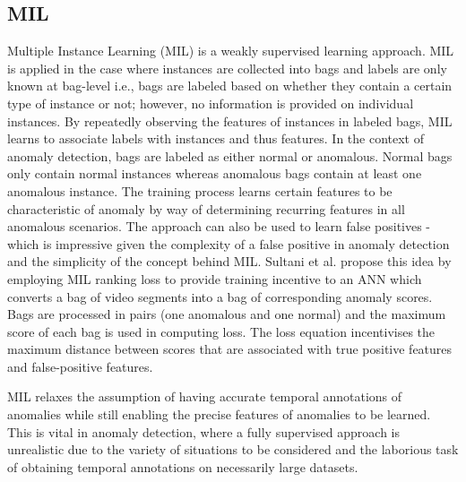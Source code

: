 \documentclass[sigplan,authorversion,nonacm, 9pt]{acmart}
\begin{document}
\subsection{MIL} \label{subsec:MIL}
Multiple Instance Learning (MIL) is a weakly supervised learning approach. MIL is applied in the case where instances are collected into bags and labels are only known at bag-level i.e., bags are labeled based on whether they contain a certain type of instance or not; however, no information is provided on individual instances. By repeatedly observing the features of instances in labeled bags, MIL learns to associate labels with instances and thus features. In the context of anomaly detection, bags are labeled as either normal or anomalous. Normal bags only contain normal instances whereas anomalous bags contain at least one anomalous instance. The training process learns certain features to be characteristic of anomaly by way of determining recurring features in all anomalous scenarios. The approach can also be used to learn false positives - which is impressive given the complexity of a false positive in anomaly detection and the simplicity of the concept behind MIL. Sultani et al. \cite{sultani} propose this idea by employing MIL ranking loss to provide training incentive to an ANN which converts a bag of video segments into a bag of corresponding anomaly scores. Bags are processed in pairs (one anomalous and one normal) and the maximum score of each bag is used in computing loss. The loss equation incentivises the maximum distance between scores that are associated with true positive features and false-positive features. 
\par
MIL relaxes the assumption of having accurate temporal annotations of anomalies while still enabling the precise features of anomalies to be learned. This is vital in anomaly detection, where a fully supervised approach is unrealistic due to the variety of situations to be considered and the laborious task of obtaining temporal annotations on necessarily large datasets.
\end{document}
